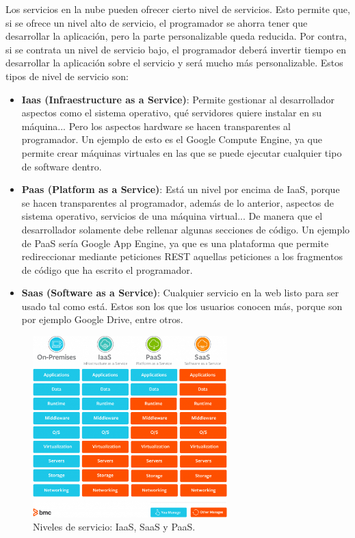 \documentclass[12pt,spanish,listoffigures,listoftables]{tfgetsinf}
\begin{document}
Los servicios en la nube pueden ofrecer cierto nivel de servicios. Esto permite que, si se ofrece un nivel alto de servicio, el programador se ahorra tener que desarrollar la aplicación, pero la parte personalizable queda reducida. Por contra, si se contrata un nivel de servicio bajo, el programador deberá invertir tiempo en desarrollar la aplicación sobre el servicio y será mucho más personalizable. Estos tipos de nivel de servicio son:

\begin{itemize}
	\item \textbf{Iaas (Infraestructure as a Service)}: Permite gestionar al desarrollador aspectos como el sistema operativo, qué servidores quiere instalar en su máquina... Pero los aspectos hardware se hacen transparentes al programador. Un ejemplo de esto es el Google Compute Engine, ya que permite crear máquinas virtuales en las que se puede ejecutar cualquier tipo de software dentro.
	\item \textbf{Paas (Platform as a Service)}: Está un nivel por encima de IaaS, porque se hacen transparentes al programador, además de lo anterior, aspectos de sistema operativo, servicios de una máquina virtual... De manera que el desarrollador solamente debe rellenar algunas secciones de código. Un ejemplo de PaaS sería Google App Engine, ya que es una plataforma que permite redireccionar mediante peticiones REST aquellas peticiones a los fragmentos de código que ha escrito el programador.
	\item \textbf{Saas (Software as a Service)}: Cualquier servicio en la web listo para ser usado tal como está. Estos son los que los usuarios conocen más, porque son por ejemplo Google Drive, entre otros.
\end{itemize}

\begin{figure}[!h]
	\centering
	\includegraphics[height=7cm]{img/iaas_saas_paas}
	\caption{Niveles de servicio: IaaS, SaaS y PaaS.}
	\label{figura:IaasSaasPaas}
\end{figure}
\end{document}
